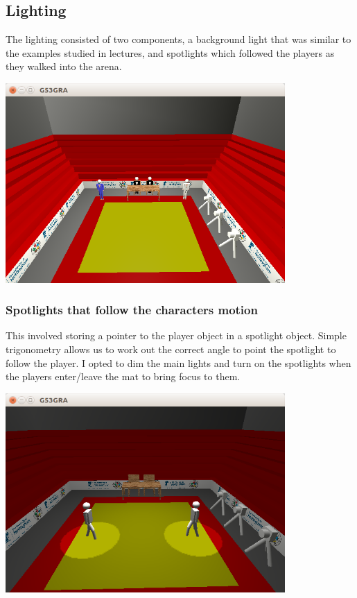 \documentclass[12pt]{article}
\begin{document}
\subsection{Lighting}

The lighting consisted of two components, a background light that was similar to the examples studied in lectures, and spotlights which followed the players as they walked into the arena.



\begin{center}
	\includegraphics[width=0.8\textwidth]{Arena.png}
\end{center}


\subsubsection{Spotlights that follow the characters motion}
This involved storing a pointer to the player object in a spotlight object. Simple trigonometry allows us to work out the correct angle to point the spotlight to follow the player. I opted to dim the main lights and turn on the spotlights when the players enter/leave the mat to bring focus to them.

\begin{center}
	\includegraphics[width=0.8\textwidth]{Spotlights.png}
\end{center}
\end{document}
